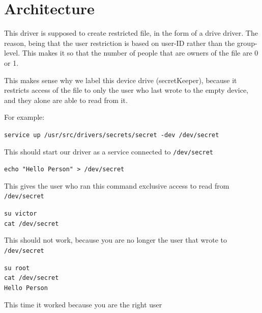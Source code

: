 \documentclass[11pt]{article}
\begin{document}
\titlerule
\newpage

\section{Architecture}
\begin{adjustwidth}{.2in}{}{

   This driver is supposed to create restricted file, in the form of a drive
   driver. The reason, being that the user restriction is based on user-ID
   rather than the group-level. This makes it so that the number of people that
   are owners of the file are 0 or 1. 

   This makes sense why we label this device drive (secretKeeper), because it
   restricts access of the file to only the user who last wrote to the empty
   device, and they alone are able to read from it.

   For example:      

   
         \begin{adjustwidth}{.2in}{}{\tt service up /usr/src/drivers/secrets/secret -dev /dev/secret
         }\end{adjustwidth}

         This should start our driver as a service connected to {\tt /dev/secret}
         
         \begin{adjustwidth}{.2in}{}{\tt echo "Hello Person" > /dev/secret 
         }\end{adjustwidth}

         This gives the user who ran this command exclusive access to read from {\tt /dev/secret}

         
         \begin{adjustwidth}{.2in}{}{\tt su victor \\ cat /dev/secret
         }\end{adjustwidth}

         This should not work, because you are no longer the user that wrote to {\tt /dev/secret}

         \begin{adjustwidth}{.2in}{}{\tt su root \\ cat /dev/secret \\ Hello Person
         }\end{adjustwidth}

         This time it worked because you are the right user

}\end{adjustwidth}
\end{document}
